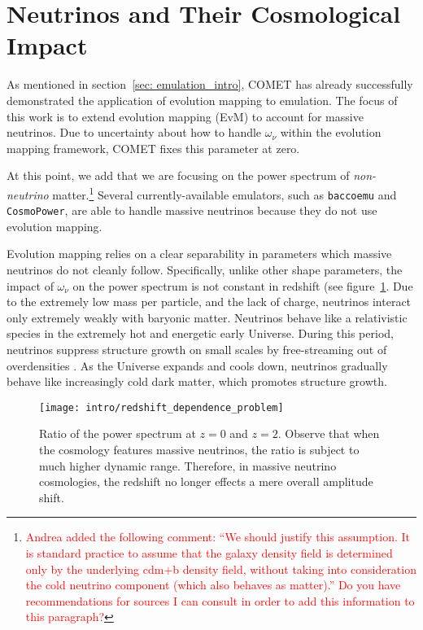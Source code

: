 \section{Neutrinos and Their Cosmological Impact}
\label{sec: neutrino_problem}

As mentioned in section~\ref{sec: emulation_intro}, COMET has already 
successfully demonstrated the application of evolution mapping to emulation. 
The focus of this work is to extend evolution mapping (EvM) to account for 
massive neutrinos. Due to uncertainty about how to handle $\omega_\nu$ within 
the evolution mapping framework, COMET fixes this parameter at zero.

At this point, we add that we are focusing on the power
spectrum of \textit{non-neutrino} matter.\footnote{\textcolor{red}{Andrea 
added the following comment: ``We should 
justify this assumption. It is standard practice to assume that the galaxy 
density field is determined only by the underlying cdm+b density field, 
without taking into consideration the cold neutrino component (which also 
behaves as matter).'' Do you have recommendations for sources I can consult in
order to add this information to this paragraph?}} Several currently-available 
emulators, such as \verb|baccoemu| and \verb|CosmoPower|, are able to handle 
massive neutrinos because they do not use evolution mapping.

Evolution mapping relies on a clear separability in parameters which massive 
neutrinos do not cleanly follow. Specifically, unlike other shape parameters, 
the impact of $\omega_\nu$ on the power spectrum is not constant in redshift
(see figure~\ref{fig: neutrinos_and_redshift}.
Due to the extremely low mass per particle, and the lack of charge, neutrinos
interact only extremely weakly with baryonic matter. Neutrinos behave like a 
relativistic species in the extremely hot and energetic early Universe.
During this period, neutrinos suppress structure growth on small scales by
free-streaming out of overdensities . As the Universe expands 
and cools down, neutrinos gradually behave like increasingly cold dark matter,
which promotes structure growth.

\begin{figure}[ht!]
  \centering
  \texttt{[image: intro/redshift\_dependence\_problem]}
  \caption[Redshift Dependence of Neutrino Impact]{Ratio of the power spectrum
  	at $z = 0$ and $z = 2$. Observe that when the cosmology features massive
  	neutrinos, the ratio is subject to much higher dynamic range. Therefore,
  	in massive neutrino cosmologies, the redshift no longer effects a
  	mere overall amplitude shift.}
  \label{fig: neutrinos_and_redshift}
\end{figure}

